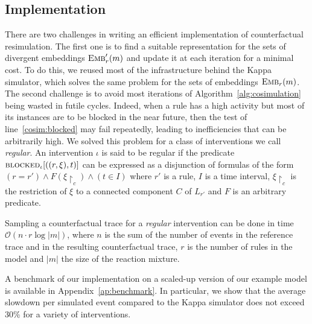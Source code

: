 
\subsection{Implementation}\label{subsec:implementation}

There are two challenges in writing an efficient implementation of
counterfactual resimulation. The first one is to find a suitable
representation for the sets of divergent embeddings ${\textsc{Emb}}'_{r}(m)$ and
update it at each iteration for a minimal cost. To do this, we reused
most of the infrastructure behind the Kappa simulator, which solves
the same problem for the sets of embeddings ${\textsc{Emb}}_{r}(m)$. The second
challenge is to avoid most iterations of
Algorithm~\ref{alg:cosimulation} being wasted in {futile
  cycles}. Indeed, when a rule has a high activity but most of its
instances are to be blocked in the near future, then the test of
line~\ref{cosim:blocked} may fail repeatedly, leading to inefficiencies
that can be arbitrarily high. We solved this problem for a class of
interventions we call \emph{regular}. An intervention $\iota$ is said
to be regular if the predicate ${\textsc{blocked}}_{\iota}[((r, \xi), t)]$ can be
expressed as a disjunction of formulas of the form
$(r = r') \wedge F(\xi{\restriction_{c}}) \wedge (t \in I)$
where $r'$ is a rule, $I$ is a time interval, $\xi{\restriction_{c}}$
is the restriction of $\xi$ to a connected component $C$ of $L_{r'}$ and
$F$ is an arbitrary predicate.

\begin{proposition}
  Sampling a counterfactual trace for a \emph{regular} intervention
  can be done in time $\mathcal{O}(n \cdot r \log|m|)$, where $n$ is
  the sum of the number of events in the reference trace and in the
  resulting counterfactual trace, $r$ is the number of rules in the
  model and $|m|$ the size of the reaction mixture.
\end{proposition}

A benchmark of our implementation on a scaled-up version of our
example model is available in Appendix~\ref{ap:benchmark}. In particular,
we show that the average slowdown per simulated event compared to the Kappa
simulator does not exceed 30\% for a variety of interventions.

\medskip